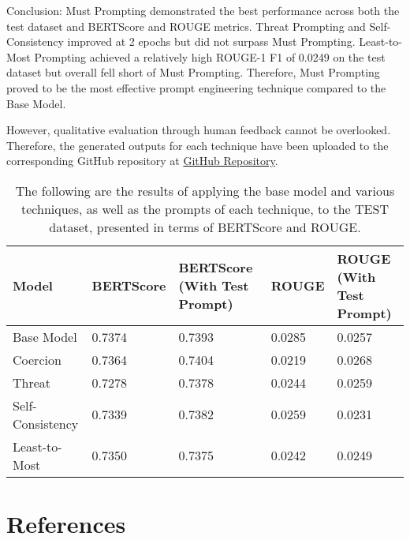 \documentclass[11pt]{article}
\begin{document}
Conclusion:
Must Prompting demonstrated the best performance across both the test dataset and BERTScore and ROUGE metrics. Threat Prompting and Self-Consistency improved at 2 epochs but did not surpass Must Prompting. Least-to-Most Prompting achieved a relatively high ROUGE-1 F1 of 0.0249 on the test dataset but overall fell short of Must Prompting. Therefore, Must Prompting proved to be the most effective prompt engineering technique compared to the Base Model.

However, qualitative evaluation through human feedback cannot be overlooked. Therefore, the generated outputs for each technique have been uploaded to the corresponding GitHub repository at \href{https://github.com/YangJiWoong96/AIFFEL_quest_rs/tree/master/MainQuest/Quest03}{GitHub Repository}.
\begin{table}[H]
\centering
\begin{tabular}{p{3cm}p{3cm}p{3cm}p{3cm}p{3cm}}
\hline
\textbf{Model} & \textbf{BERTScore} & \textbf{BERTScore (With Test Prompt)} & \textbf{ROUGE} & \textbf{ROUGE (With Test Prompt)} \\
\hline
Base Model & 0.7374 & 0.7393 & 0.0285 & 0.0257 \\
Coercion & 0.7364 & 0.7404 & 0.0219 & 0.0268 \\
Threat & 0.7278 & 0.7378 & 0.0244 & 0.0259 \\
Self-Consistency & 0.7339 & 0.7382 & 0.0259 & 0.0231 \\
Least-to-Most & 0.7350 & 0.7375 & 0.0242 & 0.0249 \\
\hline
\end{tabular}
\caption{\label{citation-guide}
The following are the results of applying the base model and various techniques, as well as the prompts of each technique, to the TEST dataset, presented in terms of BERTScore and ROUGE.}
\end{table}


\section{References}
\end{document}
